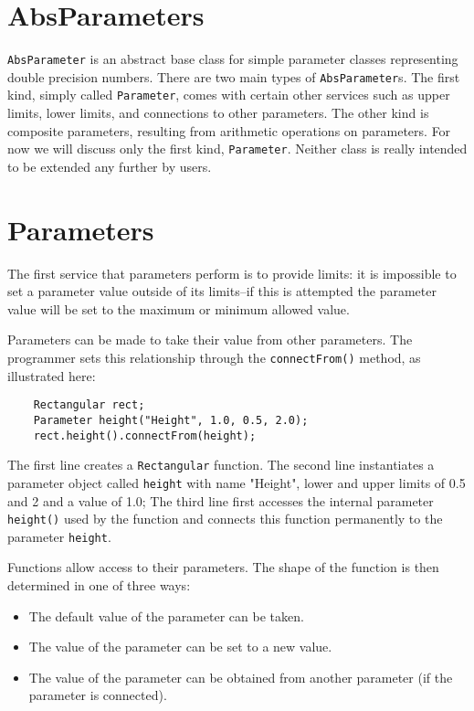 \documentclass{report}
\begin{document}
\section{AbsParameters}

\noindent \verb#AbsParameter# is an abstract base class for simple parameter
classes representing double precision numbers.  There are two main
types of \verb#AbsParameter#s.  The first kind, simply called 
\verb#Parameter#, comes with certain other services such as upper 
limits, lower limits, and connections to other parameters.  The other 
kind is composite parameters, resulting from arithmetic operations on 
parameters.  For now we will discuss only the first kind, \verb#Parameter#.  
Neither class is really intended to be extended any further by users.

\section{Parameters}

\noindent The first service that parameters perform is to provide limits: it is
impossible to set a parameter value outside of its limits--if this is
attempted the parameter value will be set to the maximum or minimum
allowed value.


\noindent Parameters can be made to take their value from other parameters. The
programmer sets this relationship through the \verb#connectFrom()# method, 
as illustrated here:
\begin{verbatim}
	Rectangular rect;
	Parameter height("Height", 1.0, 0.5, 2.0);
	rect.height().connectFrom(height);
\end{verbatim}

\noindent The first line creates a \verb#Rectangular# function.  The second line
instantiates a parameter object called \verb#height# with name "Height", lower
and upper limits of 0.5 and 2 and a value of 1.0; The third line first
accesses the internal parameter \verb#height()# used by the function and
connects this function permanently to the parameter \verb#height#.

\noindent Functions allow access to their parameters.  The shape of the function is 
then determined in one of three ways:

\begin{itemize}
\item {The default value of the parameter can be taken.}
\item {The value of the parameter can be set to a new value.}
\item {The value of the parameter can be obtained from another parameter 
(if the parameter is connected).}
\end{itemize}
\end{document}
